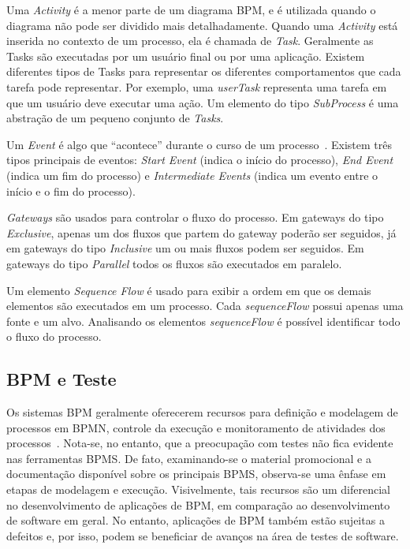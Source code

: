 \documentclass[12pt]{article}
\begin{document}
Uma \emph{Activity} é a menor parte de um diagrama BPM, e é utilizada quando o diagrama não pode ser dividido mais detalhadamente. Quando uma \emph{Activity} está inserida no contexto de um processo, ela é chamada de \emph{Task}. Geralmente as Tasks são executadas por um usuário final ou por uma aplicação. Existem diferentes tipos de Tasks para representar os diferentes comportamentos que cada tarefa pode representar. Por exemplo, uma \emph{userTask} representa uma tarefa em que um usuário deve executar uma ação. Um elemento do tipo \emph{SubProcess} é uma abstração de um pequeno conjunto de \emph{Tasks}.

Um \emph{Event} é algo que ``acontece'' durante o curso de um processo~\cite{model2011notation}. Existem três tipos principais de eventos: \emph{Start Event} (indica o início do processo), \emph{End Event} (indica um fim do processo) e \emph{Intermediate Events} (indica um evento entre o início e o fim do processo).

\emph{Gateways} são usados para controlar o fluxo do processo. Em gateways do tipo \emph{Exclusive}, apenas um dos fluxos que partem do gateway poderão ser seguidos, já em gateways do tipo \emph{Inclusive} um ou mais fluxos podem ser seguidos. Em gateways do tipo \emph{Parallel} todos os fluxos são executados em paralelo.


Um elemento \emph{Sequence Flow} é usado para exibir a ordem em que os demais elementos são executados em um processo. Cada \emph{sequenceFlow} possui apenas uma fonte e um alvo. Analisando os elementos \emph{sequenceFlow} é possível identificar todo o fluxo do processo.

\subsection{BPM e Teste}

Os sistemas BPM geralmente oferecerem recursos para definição e modelagem de processos em BPMN, controle da execução e monitoramento de atividades dos processos~\cite{forrester}. Nota-se, no entanto, que a preocupação com testes não fica evidente nas ferramentas BPMS. De fato, examinando-se o material promocional e a documentação disponível sobre os principais BPMS, observa-se uma ênfase em etapas de modelagem e execução. Visivelmente, tais recursos são um diferencial no desenvolvimento de aplicações de BPM, em comparação ao desenvolvimento de software em geral. No entanto, aplicações de BPM também estão sujeitas a defeitos e, por isso, podem se beneficiar de avanços na área de testes de software.
\end{document}
